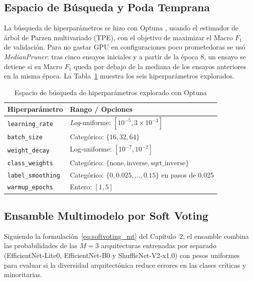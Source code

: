 \subsection{Espacio de B\'usqueda y Poda Temprana}
La b\'usqueda de hiperpar\'ametros se hizo con Optuna \cite{optuna2019}, usando el estimador de \'arbol de Parzen multivariado (TPE), con el objetivo de maximizar el Macro $F_1$ de validaci\'on. Para no gastar GPU en configuraciones poco prometedoras se us\'o \textit{MedianPruner}: tras cinco ensayos iniciales y a partir de la \'epoca 8, un ensayo se detiene si su Macro $F_1$ queda por debajo de la mediana de los ensayos anteriores en la misma \'epoca. La Tabla~\ref{tab:hpo_espacio} muestra los seis hiperpar\'ametros explorados.

\begin{table}[H]
\caption{Espacio de b\'usqueda de hiperpar\'ametros explorado con Optuna}
\label{tab:hpo_espacio}
\centering
\footnotesize
\begin{singlespace}
\begin{tabular}{lp{7.2cm}}
\toprule
\textbf{Hiperpar\'ametro} & \textbf{Rango / Opciones} \\
\midrule
\texttt{learning\_rate} & \textit{Log}-uniforme: $[10^{-5}, 3\times10^{-3}]$ \\
\texttt{batch\_size} & Categ\'orico: $\{16, 32, 64\}$ \\
\texttt{weight\_decay} & Log-uniforme: $[10^{-7}, 10^{-2}]$ \\
\texttt{class\_weights} & Categ\'orico: $\{\text{none}, \text{inverse}, \text{sqrt\_inverse}\}$ \\
\texttt{label\_smoothing} & Categ\'orico: $\{0, 0.025, \dots, 0.15\}$ en pasos de 0.025 \\
\texttt{warmup\_epochs} & Entero: $[1, 5]$ \\
\bottomrule
\end{tabular}
\end{singlespace}
\end{table}

\subsection{Ensamble Multimodelo por Soft Voting}
Siguiendo la formulaci\'on~\eqref{eq:softvoting_mt} del Cap\'itulo~2, el ensamble combina las probabilidades de las $M=3$ arquitecturas entrenadas por separado (EfficientNet-Lite0, EfficientNet-B0 y ShuffleNet-V2-x1.0) con pesos uniformes para evaluar si la diversidad arquitect\'onica reduce errores en las clases cr\'iticas y minoritarias.

